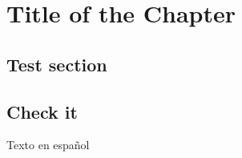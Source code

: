 \documentclass{itmthesis}
\begin{document}
\chapter{Title of the Chapter}
	\blindtext
	\section{Test section}
		\blindtext
	\section{Check it}
Texto en español	
\end{document}
